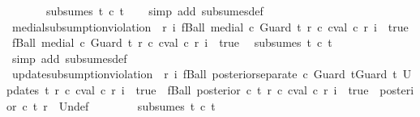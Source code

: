 \begin{isabellebody}
\ \ \ \ \ \ {\isasymnot}\ subsumes\ t{}\ c\ t{}{\isachardoublequoteclose}\isanewline
%
\isadelimproof
\ \ %
\endisadelimproof
%
\isatagproof
{}\isamarkupfalse%
\ {\isacharparenleft}simp\ add{\isacharcolon}\ subsumes{\isacharunderscore}def{\isacharparenright}%
\endisatagproof
{\isafoldproof}%
%
\isadelimproof
\isanewline
%
\endisadelimproof
\isanewline
{}\isamarkupfalse%
\ medial{\isacharunderscore}subsumption{\isacharunderscore}violation{\isacharcolon}\ {\isachardoublequoteopen}{\isasymnot}\ {\isacharparenleft}{\isasymforall}r\ i{\isachardot}\ fBall\ {\isacharparenleft}medial\ c\ {\isacharparenleft}Guard\ t{}{\isacharparenright}\ r{\isacharparenright}\ {\isacharparenleft}{\isasymlambda}c{\isachardot}\ cval\ c\ r\ i\ {\isacharequal}\ true{\isacharparenright}\ {\isasymlongrightarrow}\ fBall\ {\isacharparenleft}medial\ c\ {\isacharparenleft}Guard\ t{}{\isacharparenright}\ r{\isacharparenright}\ {\isacharparenleft}{\isasymlambda}c{\isachardot}\ cval\ c\ r\ i\ {\isacharequal}\ true{\isacharparenright}{\isacharparenright}\ {\isasymLongrightarrow}\isanewline
{\isasymnot}\ subsumes\ t{}\ c\ t{}{\isachardoublequoteclose}\isanewline
%
\isadelimproof
\ \ %
\endisadelimproof
%
\isatagproof
{}\isamarkupfalse%
\ {\isacharparenleft}simp\ add{\isacharcolon}\ subsumes{\isacharunderscore}def{\isacharparenright}%
\endisatagproof
{\isafoldproof}%
%
\isadelimproof
\isanewline
%
\endisadelimproof
\isanewline
{}\isamarkupfalse%
\ update{\isacharunderscore}subsumption{\isacharunderscore}violation{\isacharcolon}\ {\isachardoublequoteopen}{\isasymnot}\ {\isacharparenleft}{\isasymforall}r\ i{\isachardot}\ fBall\ {\isacharparenleft}posterior{\isacharunderscore}separate\ c\ {\isacharparenleft}Guard\ t{}{\isacharat}Guard\ t{}{\isacharparenright}\ {\isacharparenleft}Updates\ t{}{\isacharparenright}\ r{\isacharparenright}\ {\isacharparenleft}{\isasymlambda}c{\isachardot}\ cval\ c\ r\ i\ {\isacharequal}\ true{\isacharparenright}\ {\isasymlongrightarrow}\ fBall\ {\isacharparenleft}posterior\ c\ t{}\ r{\isacharparenright}\ {\isacharparenleft}{\isasymlambda}c{\isachardot}\ cval\ c\ r\ i\ {\isacharequal}\ true{\isacharparenright}\ {\isasymor}\ {\isacharparenleft}posterior\ c\ t{}\ r{\isacharparenright}\ {\isacharequal}\ {\isacharbraceleft}{\isacharbar}Undef{\isacharbar}{\isacharbraceright}{\isacharparenright}\ {\isasymLongrightarrow}\isanewline
\ \ \ \ \ \ {\isasymnot}\ subsumes\ t{}\ c\ t{}{\isachardoublequoteclose}\isanewline

\end{isabellebody}

